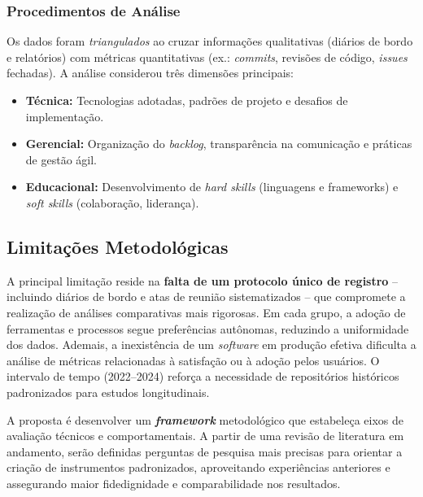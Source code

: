 \documentclass[
	12pt,           %
	openright,      %
	oneside,        %
	a4paper,        %
	brazil          %
]{abntex2}
\begin{document}
\subsubsection{Procedimentos de Análise}

Os dados foram \emph{triangulados} ao cruzar informações qualitativas (diários de bordo e relatórios) com métricas quantitativas (ex.: \emph{commits}, revisões de código, \emph{issues} fechadas). A análise considerou três dimensões principais:
\begin{itemize}
  \item \textbf{Técnica:} Tecnologias adotadas, padrões de projeto e desafios de implementação.
  \item \textbf{Gerencial:} Organização do \emph{backlog}, transparência na comunicação e práticas de gestão ágil.
  \item \textbf{Educacional:} Desenvolvimento de \emph{hard skills} (linguagens e frameworks) e \emph{soft skills} (colaboração, liderança).
\end{itemize}

\subsection{Limitações Metodológicas}

A principal limitação reside na \textbf{falta de um protocolo único de registro} – incluindo diários de bordo e atas de reunião sistematizados – que compromete a realização de análises comparativas mais rigorosas. Em cada grupo, a adoção de ferramentas e processos segue preferências autônomas, reduzindo a uniformidade dos dados. Ademais, a inexistência de um \emph{software} em produção efetiva dificulta a análise de métricas relacionadas à satisfação ou à adoção pelos usuários. O intervalo de tempo (2022--2024) reforça a necessidade de repositórios históricos padronizados para estudos longitudinais.

A proposta é desenvolver um \textbf{\emph{framework}} metodológico que estabeleça eixos de avaliação técnicos e comportamentais. A partir de uma revisão de literatura em andamento, serão definidas perguntas de pesquisa mais precisas para orientar a criação de instrumentos padronizados, aproveitando experiências anteriores e assegurando maior fidedignidade e comparabilidade nos resultados.

\end{document}
